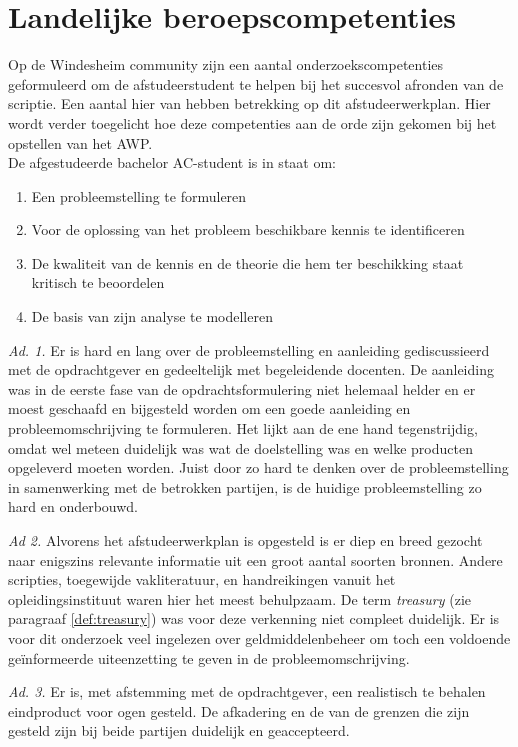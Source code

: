\documentclass[10pt,a4paper,twoside]{report}
\begin{document}
\newpage
    \section{Landelijke beroepscompetenties}
Op de Windesheim community zijn een aantal onderzoekscompetenties geformuleerd om de afstudeerstudent te helpen bij het succesvol afronden van de scriptie. Een aantal hier van hebben betrekking op dit afstudeerwerkplan. Hier wordt verder toegelicht hoe deze competenties aan de orde zijn gekomen bij het opstellen van het AWP. \\
De afgestudeerde bachelor AC-student is in staat om: 
\begin{enumerate}
    \item Een probleemstelling te formuleren
    \item Voor de oplossing van het probleem beschikbare kennis te identificeren
    \item De kwaliteit van de kennis en de theorie die hem ter beschikking staat kritisch te beoordelen
    \item De basis van zijn analyse te modelleren
\end{enumerate}

\noindent
\textit{Ad. 1.} Er is hard en lang over de probleemstelling en aanleiding gediscussieerd met de opdrachtgever en gedeeltelijk met begeleidende docenten. De aanleiding was in de eerste fase van de opdrachtsformulering niet helemaal helder en er moest geschaafd en bijgesteld worden om een goede aanleiding en probleemomschrijving te formuleren. Het lijkt aan de ene hand tegenstrijdig, omdat wel meteen duidelijk was wat de doelstelling was en welke producten opgeleverd moeten worden. Juist door zo hard te denken over de probleemstelling in samenwerking met de betrokken partijen, is de huidige probleemstelling zo hard en onderbouwd. 

\bigskip
\noindent
\textit{Ad 2.} Alvorens het afstudeerwerkplan is opgesteld is er diep en breed gezocht naar enigszins relevante informatie uit een groot aantal soorten bronnen. Andere scripties, toegewijde vakliteratuur, en handreikingen vanuit het opleidingsinstituut waren hier het meest behulpzaam. De term \textit{treasury} (zie paragraaf \ref{def:treasury}) was voor deze verkenning niet compleet duidelijk. Er is voor dit onderzoek veel ingelezen over geldmiddelenbeheer om toch een voldoende geïnformeerde uiteenzetting te geven in de probleemomschrijving. 

\bigskip
\noindent
\textit{Ad. 3.} Er is, met afstemming met de opdrachtgever, een realistisch te behalen eindproduct voor ogen gesteld. De afkadering en de van de grenzen die zijn gesteld zijn bij beide partijen duidelijk en geaccepteerd.
\end{document}

